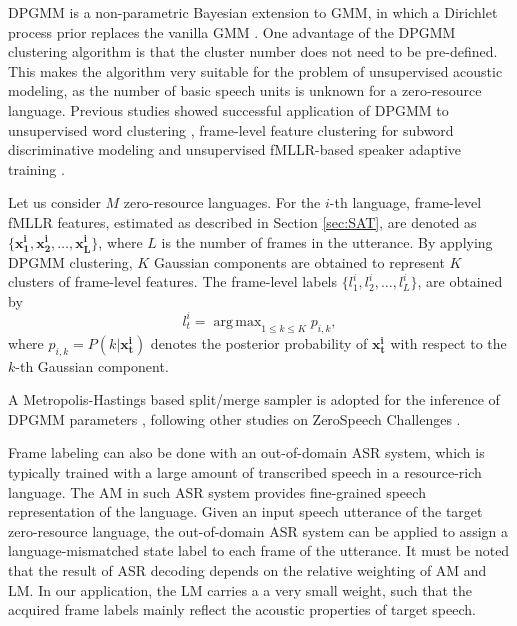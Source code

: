 \documentclass[a4paper]{article}
\DeclareMathOperator*{\argmax}{arg\,max}
\begin{document}
DPGMM is a non-parametric Bayesian extension to GMM, in which a Dirichlet process prior replaces the vanilla GMM \cite{chang2013parallel}. One advantage of the DPGMM clustering algorithm is that the cluster number does not need to be pre-defined.  This makes the algorithm very suitable for the problem of unsupervised acoustic modeling, as the number of basic speech units is unknown for a zero-resource language. Previous studies showed successful application of DPGMM to unsupervised word clustering \cite{kamper2014unsupervised}, frame-level feature clustering for subword discriminative modeling \cite{chen2015parallel} and unsupervised fMLLR-based speaker adaptive training \cite{Heck+2016,heck2017feature}.

Let us consider $M$ zero-resource languages. For the $i$-th language, frame-level fMLLR features, estimated as described in Section \ref{sec:SAT}, are denoted as $\{\bm{x_1^{i}, x_2^{i}, \ldots, x_L^{i}}\}$, where $L$ is the number of frames in the utterance. By applying DPGMM clustering, $K$ Gaussian components are obtained to represent $K$ clusters of frame-level features. The frame-level labels $\{l_1^{i}, l_2^{i}, \ldots, l_L^{i}\}$, are obtained by
\begin{equation}
\label{eqt:dpgmm_inference}
l^{i}_{t} = \argmax_{1 \le k \le K} p_{i,k},
\end{equation}
where $p_{i,k}=P(k | \bm{x_{t}^{i}})$ denotes the posterior probability of $\bm{x_{t}^{i}}$ with respect to the $k$-th Gaussian component.

A Metropolis-Hastings based split/merge sampler is adopted for the inference of DPGMM parameters \cite{chang2013parallel}, following other studies on ZeroSpeech Challenges \cite{heck2017feature,chen2015parallel}. 

Frame labeling can also be done with an out-of-domain ASR system, which is typically trained with a large amount of transcribed speech in a resource-rich language. The AM in such ASR system provides fine-grained speech representation of the language. Given an input speech utterance of the target zero-resource language, the out-of-domain ASR system can be applied to assign a language-mismatched state label to each frame of the utterance. It must be noted that the result of ASR decoding depends on the relative weighting of AM and LM. In our application, the LM carries a a very small weight, such that the acquired frame labels mainly reflect the acoustic properties of target speech. 
\end{document}
